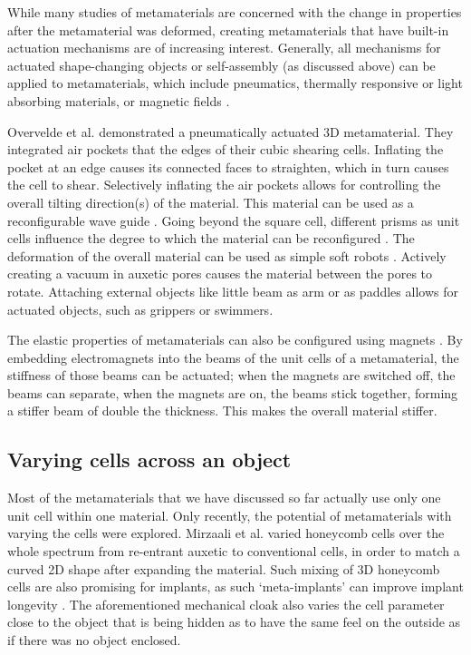 {While many studies of metamaterials are concerned with the change in properties after the metamaterial was deformed, creating metamaterials that have built-in actuation mechanisms are of increasing interest. Generally, all mechanisms for actuated shape-changing objects or self-assembly (as discussed above) can be applied to metamaterials, which include pneumatics, thermally responsive or light absorbing materials, or magnetic fields \cite{Geryak2014}. 

Overvelde et al. \cite{Overvelde2016a} demonstrated a pneumatically actuated 3D metamaterial. They integrated air pockets that the edges of their cubic shearing cells. Inflating the pocket at an edge causes its connected faces to straighten, which in turn causes the cell to shear. Selectively inflating the air pockets allows for controlling the overall tilting direction(s) of the material. This material can be used as a reconfigurable wave guide \cite{Babaee2016}. Going beyond the square cell, different prisms as unit cells influence the degree to which the material can be reconfigured \cite{Overvelde2017}. The deformation of the overall material can be used as simple soft robots \cite{Yang2015}. Actively creating a vacuum in auxetic pores causes the material between the pores to rotate. Attaching external objects like little beam as arm or as paddles allows for actuated objects, such as grippers or swimmers.

The elastic properties of metamaterials can also be configured using magnets \cite{Haghpanah2016a}. By embedding electromagnets into the beams of the unit cells of a metamaterial, the stiffness of those beams can be actuated; when the magnets are switched off, the beams can separate, when the magnets are on, the beams stick together, forming a stiffer beam of double the thickness. This makes the overall material stiffer. 



\subsection{Varying cells across an object}

Most of the metamaterials that we have discussed so far actually use only one unit cell within one material. Only recently, the potential of metamaterials with varying the cells were explored. Mirzaali et al. \cite{Mirzaali2018} varied honeycomb cells over the whole spectrum from re-entrant auxetic to conventional cells, in order to match a curved 2D shape after expanding the material. Such mixing of 3D honeycomb cells are also promising for implants, as such `meta-implants' can improve implant longevity \cite{Kolken2018}. The aforementioned mechanical cloak \cite{Buckmann2014, Buckmann2015a} also varies the cell parameter close to the object that is being hidden as to have the same feel on the outside as if there was no object enclosed.

}
